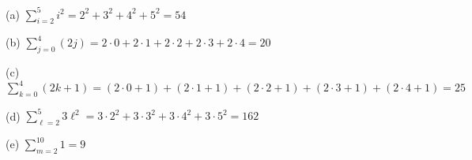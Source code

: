 
(a)
$\sum_{i = 2}^5 i^2 = 2^2 + 3^2 + 4^2 + 5^2 = 54$ 

(b)
$\sum_{j = 0}^4 (2j) = 2\cdot 0 + 2 \cdot 1 + 2 \cdot 2 + 2 \cdot 3 + 2 \cdot 4 = 20$ 

        
(c)
$\sum_{k = 0}^4 (2k + 1) = 
(2\cdot 0 + 1) +
(2 \cdot 1 + 1) +
(2 \cdot 2 + 1) +
(2 \cdot 3 + 1) +
(2 \cdot 4 + 1) = 25$

(d)
$\sum_{\ell = 2}^5 3 \ell^2 =
3 \cdot 2^2 +
3 \cdot 3^2 +
3 \cdot 4^2 +
3 \cdot 5^2 = 162$ 

(e)
$\sum_{m = 2}^{10} 1 = 9$
